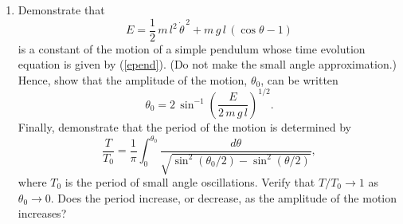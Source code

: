 {\begin{enumerate}
\item Demonstrate that 
$$
E = \frac{1}{2}\,m\,l^2\,\dot{\theta}^{\,2} + m\,g\,l\,(\cos\theta-1)
$$
is a constant of the motion of a simple pendulum whose time evolution equation
is given by (\ref{epend}). (Do not make the small angle approximation.) Hence, show
that the amplitude of the motion, $\theta_0$, can be written
$$
\theta_0 = 2\,\sin^{-1}\left(\frac{E}{2\,m\,g\,l}\right)^{1/2}.
$$
Finally, demonstrate that the period of the motion is determined by
$$
\frac{T}{T_0} = \frac{1}{\pi}\int_0^{\theta_0}\frac{d\theta}{\sqrt{\sin^2(\theta_0/2)-\sin^2(\theta/2)}},
$$
where $T_0$ is the period of small angle oscillations. Verify that $T/T_0\rightarrow 1$
as $\theta_0\rightarrow 0$. Does the period increase, or decrease, as the amplitude
of the motion increases?
\end{enumerate}
}
